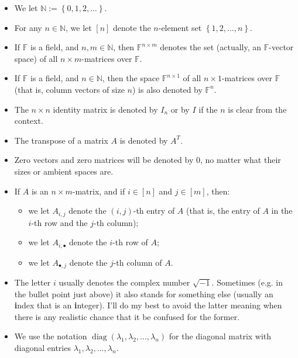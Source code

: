 \documentclass[numbers=enddot,12pt,final,onecolumn,notitlepage]{scrartcl}%
\numberwithin{exer}{subsection}
\theoremstyle{definition}
\begin{document}
\begin{itemize}
\item We let $\mathbb{N}:=\left\{  0,1,2,\ldots\right\}  $.

\item For any $n\in\mathbb{N}$, we let $\left[  n\right]  $ denote the
$n$-element set $\left\{  1,2,\ldots,n\right\}  $.

\item If $\mathbb{F}$ is a field, and $n,m\in\mathbb{N}$, then $\mathbb{F}%
^{n\times m}$ denotes the set (actually, an $\mathbb{F}$-vector space) of all
$n\times m$-matrices over $\mathbb{F}$.

\item If $\mathbb{F}$ is a field, and $n\in\mathbb{N}$, then the space
$\mathbb{F}^{n\times1}$ of all $n\times1$-matrices over $\mathbb{F}$ (that is,
column vectors of size $n$) is also denoted by $\mathbb{F}^{n}$.

\item The $n\times n$ identity matrix is denoted by $I_{n}$ or by $I$ if the
$n$ is clear from the context.

\item The transpose of a matrix $A$ is denoted by $A^{T}$.

\item Zero vectors and zero matrices will be denoted by $0$, no matter what
their sizes or ambient spaces are.

\item If $A$ is an $n\times m$-matrix, and if $i\in\left[  n\right]  $ and
$j\in\left[  m\right]  $, then:

\begin{itemize}
\item we let $A_{i,j}$ denote the $\left(  i,j\right)  $-th entry of $A$ (that
is, the entry of $A$ in the $i$-th row and the $j$-th column);

\item we let $A_{i,\bullet}$ denote the $i$-th row of $A$;

\item we let $A_{\bullet,j}$ denote the $j$-th column of $A$.
\end{itemize}

\item The letter $i$ usually denotes the complex number $\sqrt{-1}$. Sometimes
(e.g. in the bullet point just above) it also stands for something else
(usually an \textbf{i}ndex that is an \textbf{i}nteger). I'll do my best to
avoid the latter meaning when there is any realistic chance that it be
confused for the former.

\item We use the notation $\operatorname*{diag}\left(  \lambda_{1},\lambda
_{2},\ldots,\lambda_{n}\right)  $ for the diagonal matrix with diagonal
entries $\lambda_{1},\lambda_{2},\ldots,\lambda_{n}$.
\end{itemize}
\end{document}
